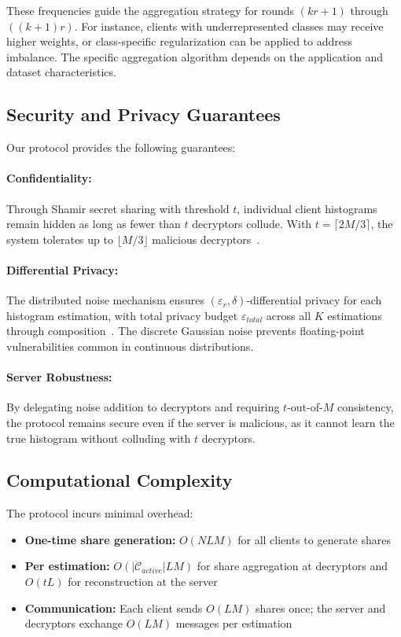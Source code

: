 \documentclass[runningheads]{llncs}
\begin{document}
These frequencies guide the aggregation strategy for rounds $(kr+1)$ through $((k+1)r)$. For instance, clients with underrepresented classes may receive higher weights, or class-specific regularization can be applied to address imbalance. The specific aggregation algorithm depends on the application and dataset characteristics.

\subsection{Security and Privacy Guarantees}

Our protocol provides the following guarantees:

\paragraph{Confidentiality:} Through Shamir secret sharing with threshold $t$, individual client histograms remain hidden as long as fewer than $t$ decryptors collude. With $t = \lceil 2M/3 \rceil$, the system tolerates up to $\lfloor M/3 \rfloor$ malicious decryptors~\cite{flamingo2023}.

\paragraph{Differential Privacy:} The distributed noise mechanism ensures $(\varepsilon_r, \delta)$-differential privacy for each histogram estimation, with total privacy budget $\varepsilon_{total}$ across all $K$ estimations through composition~\cite{kairouz2021distributed}. The discrete Gaussian noise prevents floating-point vulnerabilities common in continuous distributions.

\paragraph{Server Robustness:} By delegating noise addition to decryptors and requiring $t$-out-of-$M$ consistency, the protocol remains secure even if the server is malicious, as it cannot learn the true histogram without colluding with $t$ decryptors.

\subsection{Computational Complexity}

The protocol incurs minimal overhead:
\begin{itemize}
    \item \textbf{One-time share generation:} $O(NLM)$ for all clients to generate shares
    \item \textbf{Per estimation:} $O(|\mathcal{C}_{active}|LM)$ for share aggregation at decryptors and $O(tL)$ for reconstruction at the server
    \item \textbf{Communication:} Each client sends $O(LM)$ shares once; the server and decryptors exchange $O(LM)$ messages per estimation
\end{itemize}
\end{document}

